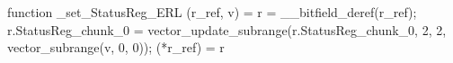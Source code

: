 function _set_StatusReg_ERL (r_ref, v) = {
    r = __bitfield_deref(r_ref);
    r.StatusReg_chunk_0 = vector_update_subrange(r.StatusReg_chunk_0, 2, 2, vector_subrange(v, 0, 0));
    (*r_ref) = r
}
